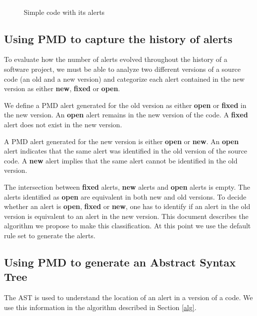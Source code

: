 \documentclass[
]{article}
\begin{document}
\begin{figure}
\centering
\includegraphics{figures/fake.png}
\caption{Simple code with its alerts \label{simple_code}}
\end{figure}
\normalsize


\subsection{Using PMD to capture the history of alerts}\label{history}

To evaluate how the number of alerts evolved throughout the history of a
software project, we must be able to analyze two different versions of a
source code (an old and a new version) and categorize each alert contained 
in the new version as either \textbf{new}, \textbf{fixed} or \textbf{open}. 

We define a PMD alert generated for the old version as either
\textbf{open} or \textbf{fixed} in the new version. An \textbf{open}
alert remains in the new version of the code. A \textbf{fixed} alert
does not exist in the new version.

A PMD alert generated for the new version is either \textbf{open} or
\textbf{new}. An \textbf{open} alert indicates that the same alert was
identified in the old version of the source code. A \textbf{new} alert
implies that the same alert cannot be identified in the old version.

The intersection between \textbf{fixed} alerts, \textbf{new} alerts and
\textbf{open} alerts is empty. The alerts identified as \textbf{open} 
are equivalent in both new and old versions. To decide whether an alert
is \textbf{open}, \textbf{fixed} or \textbf{new}, one has to identify 
if an alert in the old version is equivalent to an alert in the new 
version. This document describes the algorithm we propose to make this
classification. At this point we use the default rule set to generate
the alerts.

\subsection{Using PMD to generate an Abstract Syntax Tree}\label{ast}

The AST is used to understand the location of an alert in a version of
a code. We use this information in the algorithm described in Section \ref{alg}.
\end{document}
